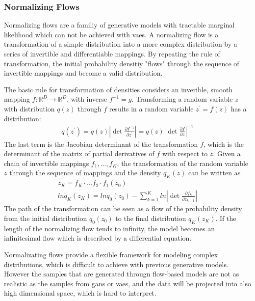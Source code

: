 \documentclass[12pt,DIV14,BCOR12mm,a4paper,footinclude=false,headinclude,parskip=half-,twoside,openright,cleardoublepage=empty,toc=index,bibliography=totoc,listof=totoc]{scrreprt}
\numberwithin{equation}{chapter}
\begin{document}
\subsubsection{Normalizing Flows}
Normalizing flows\cite{rezende2016variational} are a familiy of generative models with tractable marginal likelihood which can not be achieved with \glspl{vae}. A normalizing flow is a transformation of a simple distribution into a more complex distribution by a series of invertible and differentiable mappings. By repeating the rule of transformation, the initial probability densitiy "flows" through the sequence of invertible mappings and become a valid distribution.

The basic rule for transformation of densities considers an inverible, smooth mapping $f: \mathbb{R}^{D} \rightarrow \mathbb{R}^{D}$, with inverse $f^{-1} = g$. Transforming a random variable $z$ with distribution $q(z)$ through $f$ results in a random variable $z^{'}  = f(z)$ has a distribution:
\begin{align}
  q(z^{'}) = q(z) \left| \det \frac{\partial f^{-1}}{\partial z^{'}} \right| = q(z) \left| \det \frac{\partial f}{\partial z} \right|^{-1}
\end{align}
The last term is the Jacobian determinant of the transformation $f$, which is the determinant of the matrix of partial derivatives of $f$ with respect to $z$. Given a chain of invertible mappings $f_{1},...,f_{K}$, the transformation of the random variable $z$ through the sequence of mappings and the density $q_{K}(z)$ can be written as
\begin{gather}
  z_{K} = f_{K} \cdot ... f_{2} \cdot f_{1}(z_{0})\\
  lnq_{K}(z_{K}) = lnq_{0}(z_{0}) - \sum_{k=1}^{K} ln \left| \det \frac{\partial f_{k}}{\partial z_{k-1}} \right|
\end{gather}
The path of the transformation can be seen as a flow of the probability density from the initial distribution $q_{0}(z_{0})$ to the final distribution $q_{K}(z_{K})$. If the length of the normalizing flow tends to infinity, the model becomes an infinitesimal flow which is described by a differential equation.

Normalizating flows provide a flexible framework for modeling complex distributions, which is difficult to achieve with previous generative models. However the samples that are generated througn flow-based models are not as realistic as the samples from \glspl{gan} or \glspl{vae}, and the data will be projected into also high dimensional space, which is hard to interpret.
\end{document}
